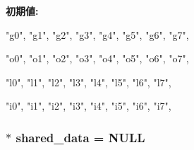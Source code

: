 \label{namespaceTrace_a4b9af3ca9339fc3f7d523eb06a2c1d40}
{\bfseries 初期値:}
\begin{DoxyCode}
 {
    
    "g0", "g1", "g2", "g3", "g4", "g5", "g6", "g7",
    
    "o0", "o1", "o2", "o3", "o4", "o5", "o6", "o7",
    
    "l0", "l1", "l2", "l3", "l4", "l5", "l6", "l7",
    
    "i0", "i1", "i2", "i3", "i4", "i5", "i6", "i7",
}
\end{DoxyCode}
\hypertarget{namespaceTrace_a5416904b225ef0514d8e5b146e5ffe71}{
\subsubsection[{shared\_\-data}]{$\ast$ {\bf shared\_\-data} = NULL}}
\label{namespaceTrace_a5416904b225ef0514d8e5b146e5ffe71}
